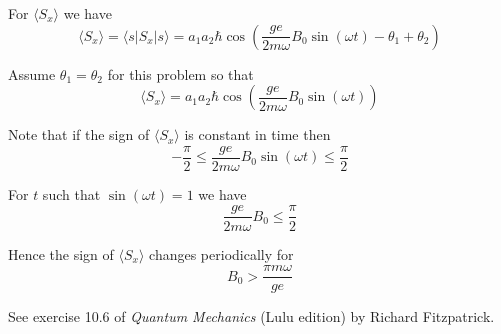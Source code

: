 For $\langle S_x\rangle$ we have
\begin{equation*}
\langle S_x\rangle=\langle s|S_x|s\rangle
=a_1a_2\hbar\cos\left(\frac{ge}{2m\omega}B_0\sin(\omega t)-\theta_1+\theta_2\right)
\tag{2}
\end{equation*}

Assume $\theta_1=\theta_2$ for this problem so that
\begin{equation*}
\langle S_x\rangle=a_1a_2\hbar\cos\left(\frac{ge}{2m\omega}B_0\sin(\omega t)\right)
\end{equation*}

Note that if the sign of $\langle S_x\rangle$ is constant in time then
\begin{equation*}
-\frac{\pi}{2}\le\frac{ge}{2m\omega}B_0\sin(\omega t)\le\frac{\pi}{2}
\end{equation*}

For $t$ such that $\sin(\omega t)=1$ we have
\begin{equation*}
\frac{ge}{2m\omega}B_0\le\frac{\pi}{2}
\end{equation*}

Hence the sign of $\langle S_x\rangle$ changes periodically for
\begin{equation*}
B_0>\frac{\pi m\omega}{ge}
\end{equation*}

See exercise 10.6 of {\it Quantum Mechanics}
(Lulu edition) by Richard Fitzpatrick.


